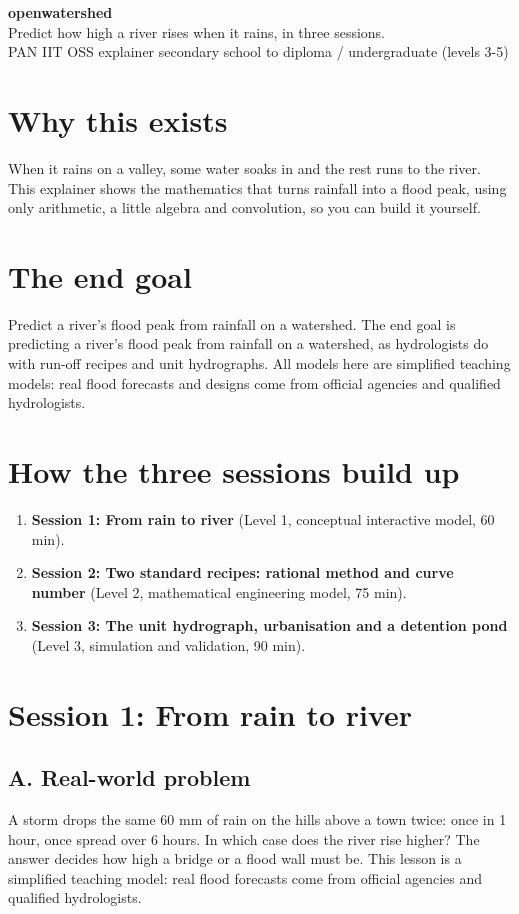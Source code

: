\documentclass[11pt,a4paper]{article}
\begin{document}
\begin{center}{\LARGE\bfseries openwatershed}\\[0.4em]{\large Predict how high a river rises when it rains, in three sessions.}\\[0.2em]\small PAN IIT OSS explainer \textbullet{} secondary school to diploma / undergraduate (levels 3-5)\end{center}

\section*{Why this exists}
When it rains on a valley, some water soaks in and the rest runs to the river. This explainer shows the mathematics that turns rainfall into a flood peak, using only arithmetic, a little algebra and convolution, so you can build it yourself.

\section*{The end goal}
Predict a river's flood peak from rainfall on a watershed. The end goal is predicting a river's flood peak from rainfall on a watershed, as hydrologists do with run-off recipes and unit hydrographs. All models here are simplified teaching models: real flood forecasts and designs come from official agencies and qualified hydrologists.

\section*{How the three sessions build up}
\begin{enumerate}[nosep]
\item \textbf{Session 1: From rain to river} (Level 1, conceptual interactive model, 60 min).
\item \textbf{Session 2: Two standard recipes: rational method and curve number} (Level 2, mathematical engineering model, 75 min).
\item \textbf{Session 3: The unit hydrograph, urbanisation and a detention pond} (Level 3, simulation and validation, 90 min).
\end{enumerate}

\section{Session 1: From rain to river}

\subsection*{A. Real-world problem}
A storm drops the same 60 mm of rain on the hills above a town twice: once in 1 hour, once spread over 6 hours. In which case does the river rise higher? The answer decides how high a bridge or a flood wall must be. This lesson is a simplified teaching model: real flood forecasts come from official agencies and qualified hydrologists.
\end{document}
